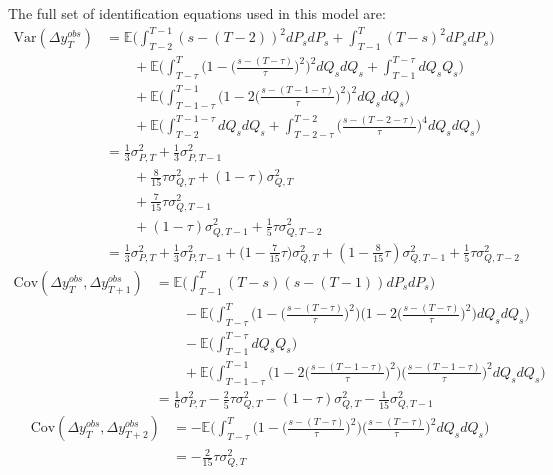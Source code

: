 The full set of identification equations used in this model are:
\begin{align*}
\mathrm{Var}(\Delta y^{obs}_T) &= \mathbb{E} \Big(\int_{T-2}^{T-1} (s-(T-2))^2 dP_s dP_s  + \int_{T-1}^{T} (T-s)^2 dP_s dP_s \Big) \nonumber \\
& \qquad + \mathbb{E} \Big(\int_{T-\tau}^{T}\Big( 1 - \Big(\frac{s-(T-\tau)}{\tau}\Big)^2\Big)^2 dQ_s dQ_s +\int_{T-1}^{T-\tau}  dQ_s Q_s\Big) \nonumber \\
& \qquad + \mathbb{E} \Big(  \int_{T-1-\tau}^{T-1} \Big(1 - 2\Big(\frac{s-(T-1-\tau)}{\tau}\Big)^2 \Big)^2 dQ_s dQ_s \Big) \nonumber \\
& \qquad + \mathbb{E} \Big( \int_{T-2}^{T-1-\tau}  dQ_s dQ_s  +\int_{T-2-\tau}^{T-2} \Big(\frac{s-(T-2-\tau)}{\tau}\Big)^4 dQ_s dQ_s  \Big) \nonumber \\
&= \frac{1}{3}\sigma^2_{P,T} + \frac{1}{3}\sigma^2_{P,T-1} \nonumber \\
& \qquad + \frac{8}{15} \tau \sigma^2_{Q,T} + (1-\tau) \sigma^2_{Q,T} \nonumber \\
& \qquad + \frac{7}{15} \tau\sigma^2_{Q,T-1} \nonumber \\
& \qquad +(1-\tau) \sigma^2_{Q,T-1} + \frac{1}{5} \tau\sigma^2_{Q,T-2} \nonumber \\
&= \frac{1}{3}\sigma^2_{P,T} + \frac{1}{3}\sigma^2_{P,T-1} + \big(1-\frac{7}{15}\tau\big) \sigma^2_{Q,T}   +(1-\frac{8}{15}\tau) \sigma^2_{Q,T-1} + \frac{1}{5} \tau\sigma^2_{Q,T-2}
\end{align*}
\begin{align*}
\mathrm{Cov}(\Delta y^{obs}_T, \Delta y^{obs}_{T+1}) &=  \mathbb{E} \Big(\int_{T-1}^{T} (T-s)(s-(T-1)) dP_s dP_s  \Big) \nonumber \\
&  \qquad -\mathbb{E} \Big(\int_{T-\tau}^{T}\Big( 1 - \Big(\frac{s-(T-\tau)}{\tau}\Big)^2\Big) \Big( 1 - 2\Big(\frac{s-(T-\tau)}{\tau}\Big)^2\Big)  dQ_s dQ_s\Big) \nonumber\\
& \qquad -\mathbb{E} \Big( \int_{T-1}^{T-\tau}  dQ_s Q_s\Big) \nonumber \\
& \qquad +\mathbb{E} \Big( \int_{T-1-\tau}^{T-1}\Big( 1 - 2\Big(\frac{s-(T-1-\tau)}{\tau}\Big)^2\Big)  \Big(\frac{s-(T-1-\tau)}{\tau}\Big)^2 dQ_s dQ_s\Big) \nonumber \\
&= \frac{1}{6}\sigma^2_{P,T}  -\frac{2}{5}\tau \sigma^2_{Q,T}  -(1-\tau) \sigma^2_{Q,T}  -\frac{1}{15} \sigma^2_{Q,T-1} \nonumber 
\end{align*}
\begin{align*}
\mathrm{Cov}(\Delta y^{obs}_T, \Delta y^{obs}_{T+2}) &=  -\mathbb{E} \Big(\int_{T-\tau}^{T} \Big( 1 - \Big(\frac{s-(T-\tau)}{\tau}\Big)^2\Big) \Big(\frac{s-(T-\tau)}{\tau}\Big)^2 dQ_s dQ_s  \Big) \nonumber \\
&= -\frac{2}{15}\tau \sigma^2_{Q,T}
\end{align*}
